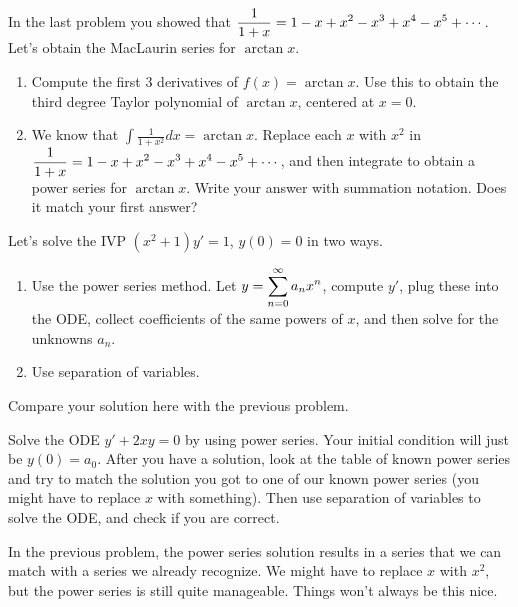 \begin{problem}
In the last problem you showed that $\displaystyle\frac{1}{1+x}=1-x+x^2-x^3+x^4-x^5+\cdots$.  Let's obtain the MacLaurin series for $\arctan x$. 
\begin{enumerate}
 \item Compute the first 3 derivatives of $f(x) = \arctan x$. Use this to obtain the third degree Taylor polynomial of $\arctan x$, centered at $x=0$.
 \item We know that $\int \frac{1}{1+x^2}dx = \arctan x$.  Replace each $x$ with $x^2$ in  $\displaystyle\frac{1}{1+x}=1-x+x^2-x^3+x^4-x^5+\cdots$, and then integrate to obtain a power series for $\arctan x$. Write your answer with summation notation. Does it match your first answer?
\end{enumerate}
\end{problem}


\begin{problem}
 Let's solve the IVP $(x^2+1)y'=1$, $y(0)=0$ in two ways. 
\begin{enumerate}
 \item Use the power series method. Let $\displaystyle y = \sum_{n=0}^\infty a_nx^n$, compute $y'$, plug these into the ODE, collect coefficients of the same powers of $x$, and then solve for the unknowns $a_n$.
 \item Use separation of variables. 
\end{enumerate}
Compare your solution here with the previous problem.
\end{problem}


\begin{problem}
 Solve the ODE $y'+2xy=0$ by using power series.  Your initial condition will just be $y(0)=a_0$. After you have a solution, look at the table of known power series and try to match the solution you got to one of our known power series (you might have to replace $x$ with something). Then use separation of variables to solve the ODE, and check if you are correct.  
\end{problem}

In the previous problem, the power series solution results in a series that we can match with a series we already recognize.  We might have to replace $x$ with $x^2$, but the power series is still quite manageable.  Things won't always be this nice. 

